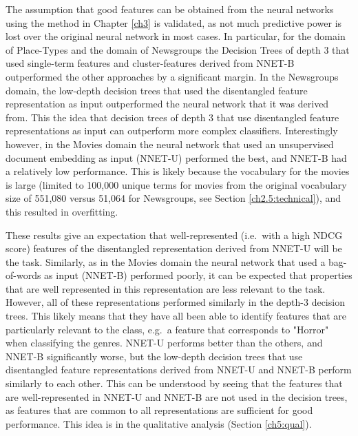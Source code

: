 The assumption that good  features can be obtained from the neural networks using the method in Chapter \ref{ch3} is validated, as not much predictive power is lost over the original neural network in most cases. In particular, for the domain of Place-Types and the domain of Newsgroups the Decision Trees of depth 3 that used  single-term features and cluster-features derived from NNET-B outperformed the other approaches by a significant margin. In the Newsgroups domain, the low-depth decision trees that used the disentangled feature representation as input outperformed the neural network that  it was derived from. This   the idea that decision trees of depth 3 that use disentangled feature representations as input can outperform more complex classifiers. Interestingly however, in the  Movies domain the neural network that used an unsupervised document embedding as input (NNET-U) performed the best, and NNET-B had a relatively low performance.  This is likely because the vocabulary for the movies is large (limited to 100,000 unique terms for movies from the original vocabulary size of 551,080 versus 51,064 for Newsgroups, see Section \ref{ch2.5:technical}), and this resulted in overfitting. 

These results give an  expectation that well-represented (i.e.\ with a high NDCG score) features of the disentangled representation derived from NNET-U  will be   the task. Similarly, as in the Movies domain the neural network that used a  bag-of-words as input (NNET-B) performed poorly, it can be expected that properties that are well represented in this representation are less relevant to the task. However, all of these representations performed similarly in the depth-3 decision trees. This likely means that they  have all been able to identify  features that are particularly relevant to the class, e.g.\ a feature that corresponds to "Horror" when classifying the genres. NNET-U performs better than the others, and NNET-B significantly worse, but the low-depth decision trees that use disentangled feature representations derived from NNET-U and NNET-B perform similarly to each other. This can be understood by seeing that the features that are well-represented in NNET-U and NNET-B are not used in the decision trees, as features that are common to all representations are sufficient for good performance. This idea is  in the qualitative analysis (Section \ref{ch5:qual}).


